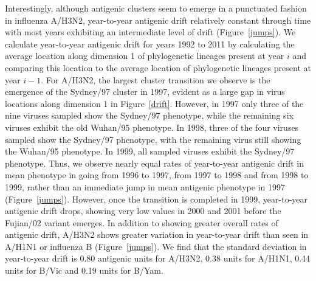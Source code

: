 \documentclass[11pt,oneside,letterpaper]{article}
\begin{document}
Interestingly, although antigenic clusters seem to emerge in a punctuated fashion in influenza A/H3N2, year-to-year antigenic drift relatively constant through time with most years exhibiting an intermediate level of drift (Figure~\ref{jumps}).
We calculate year-to-year antigenic drift for years 1992 to 2011 by calculating the average location along dimension 1 of phylogenetic lineages present at year $i$ and comparing this location to the average location of phylogenetic lineages present at year $i-1$.
For A/H3N2, the largest cluster transition we observe is the emergence of the Sydney/97 cluster in 1997, evident as a large gap in virus locations along dimension 1 in Figure~\ref{drift}.
However, in 1997 only three of the nine viruses sampled show the Sydney/97 phenotype, while the remaining six viruses exhibit the old Wuhan/95 phenotype.
In 1998, three of the four viruses sampled show the Sydney/97 phenotype, with the remaining virus still showing the Wuhan/95 phenotype.
In 1999, all sampled viruses exhibit the Sydney/97 phenotype.
Thus, we observe nearly equal rates of year-to-year antigenic drift in mean phenotype in going from 1996 to 1997, from 1997 to 1998 and from 1998 to 1999, rather than an immediate jump in mean antigenic phenotype in 1997 (Figure~\ref{jumps}).
However, once the transition is completed in 1999, year-to-year antigenic drift drops, showing very low values in 2000 and 2001 before the Fujian/02 variant emerges.
In addition to showing greater overall rates of antigenic drift, A/H3N2 shows greater variation in year-to-year drift than seen in A/H1N1 or influenza B (Figure~\ref{jumps}).
We find that the standard deviation in year-to-year drift is 0.80 antigenic units for A/H3N2, 0.38 units for A/H1N1, 0.44 units for B/Vic and 0.19 units for B/Yam.
\end{document}

